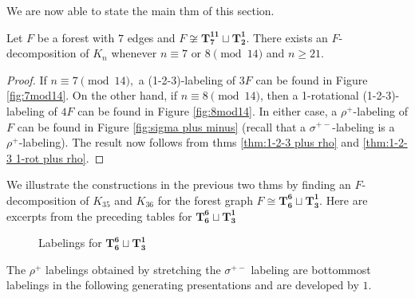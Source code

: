 We are now able to state the main thm of this section.
\begin{thm}\label{thm:7 or 8 mod 14}
    Let $F$ be a forest with $7$ edges and $F \not \cong \mathbf{T_{7}^{11}}\sqcup\mathbf{T_{2}^{1}}$. There exists an $F$-decomposition of $K_n$ whenever $n \equiv 7 \textrm{ or } 8 \pmod{14}$ and $n \geq 21.$
\end{thm}
\begin{proof}
    If $n \equiv 7 \pmod{14},$ a (1-2-3)-labeling of $3F$ can be found in Figure \ref{fig:7mod14}. On the other hand, if $n \equiv 8 \pmod{14}$, then a 1-rotational (1-2-3)-labeling of $4F$ can be found in Figure \ref{fig:8mod14}. In either case, a $\rho^{+}$-labeling of $F$ can be found in Figure \ref{fig:sigma plus minus} (recall that a $\sigma^{+-}$-labeling is a $\rho^{+}$-labeling). The result now follows from thms \ref{thm:1-2-3 plus rho} and \ref{thm:1-2-3 1-rot plus rho}. 
\end{proof}
\begin{example}
We illustrate the constructions in the previous two thms by finding an $F$-decomposition of $K_{35}$ and $K_{36}$ for the forest graph $F \cong \mathbf{T_{6}^{6}} \sqcup \mathbf{T_{3}^{1}}$. 
\newpage
\noindent Here are excerpts from the preceding tables for $\mathbf{T_{6}^{6}} \sqcup \mathbf{T_{3}^{1}}$

\begin{figure}[H]
\centering
        \scalebox{0.4}{}
        \caption{Labelings for $\mathbf{T_{6}^{6}} \sqcup \mathbf{T_{3}^{1}}$}
        \label{fig:example chart}
\end{figure}

The $\rho^{+}$ labelings obtained by stretching the $\sigma^{+-}$ labeling are bottommost labelings in the following generating presentations and are developed by $1$.
\end{example}

        
        
